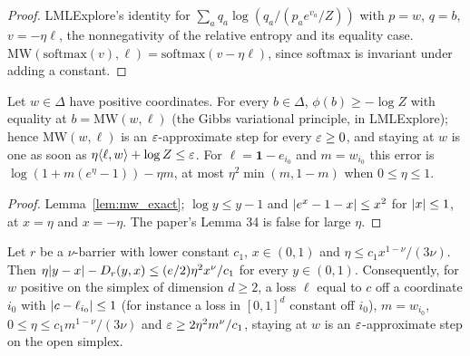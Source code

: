 \begin{proof}
  \leanok
  LMLExplore's identity for $\sum_a q_a\log(q_a/(p_a e^{v_a}/Z))$ with $p = w$, $q = b$,
  $v = -\eta\ell$, the nonnegativity of the relative entropy and its equality case.
  $\mathrm{MW}(\mathrm{softmax}(v), \ell) = \mathrm{softmax}(v - \eta\ell)$, since softmax is
  invariant under adding a constant.
\end{proof}

\begin{lemma}
  \label{lem:entropy_stuck}
  \leanok
  Let $w \in \Delta$ have positive coordinates. For every $b \in \Delta$,
  $\phi(b) \ge -\log Z$ with equality at $b = \mathrm{MW}(w, \ell)$ (the Gibbs variational principle,
  in LMLExplore); hence $\mathrm{MW}(w, \ell)$ is an $\varepsilon$-approximate step for every $\varepsilon \ge 0$,
  and staying at $w$ is one as soon as $\eta\langle \ell, w \rangle + \log Z \le \varepsilon$. For $\ell = \mathbf 1 -
  e_{i_0}$ and $m = w_{i_0}$ this error is $\log(1 + m(e^\eta - 1)) - \eta m$, at most
  $\eta^2\min(m, 1 - m)$ when $0 \le \eta \le 1$.
\end{lemma}

\begin{proof}
  \leanok
  Lemma~\ref{lem:mw_exact}; $\log y \le y - 1$ and $\lvert e^x - 1 - x \rvert \le x^2$ for $\lvert x \rvert \le 1$,
  at $x = \eta$ and $x = -\eta$. The paper's Lemma 34 is false for large $\eta$.
\end{proof}

\begin{lemma}
  \label{lem:barrier_stuck}
  \leanok
  Let $r$ be a $\nu$-barrier with lower constant $c_1$, $x \in (0, 1)$ and
  $\eta \le c_1 x^{1-\nu}/(3\nu)$. Then $\eta\lvert y - x \rvert - D_r(y, x) \le (e/2)\eta^2x^\nu/c_1$
  for every $y \in (0, 1)$. Consequently, for $w$ positive on the simplex of dimension $d \ge 2$, a
  loss $\ell$ equal to $c$ off a coordinate $i_0$ with $\lvert c - \ell_{i_0} \rvert \le 1$ (for instance a
  loss in $[0, 1]^d$ constant off $i_0$), $m = w_{i_0}$, $0 \le \eta \le c_1m^{1-\nu}/(3\nu)$ and
  $\varepsilon \ge 2\eta^2m^\nu/c_1$, staying at $w$ is an $\varepsilon$-approximate step on the open simplex.
\end{lemma}

